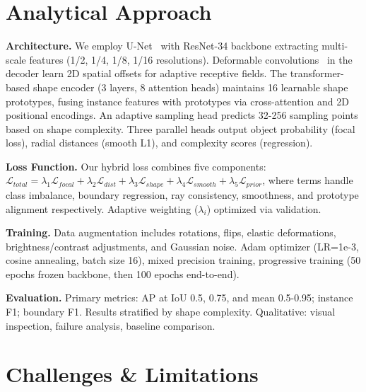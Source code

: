 \documentclass[acmlarge]{acmart}
\begin{document}
\section{Analytical Approach}

\textbf{Architecture.} We employ U-Net~\cite{ronneberger2015unet} with ResNet-34 backbone extracting multi-scale features (1/2, 1/4, 1/8, 1/16 resolutions). Deformable convolutions~\cite{dai2017deformable} in the decoder learn 2D spatial offsets for adaptive receptive fields. The transformer-based shape encoder (3 layers, 8 attention heads) maintains 16 learnable shape prototypes, fusing instance features with prototypes via cross-attention and 2D positional encodings. An adaptive sampling head predicts 32-256 sampling points based on shape complexity. Three parallel heads output object probability (focal loss), radial distances (smooth L1), and complexity scores (regression).

\textbf{Loss Function.} Our hybrid loss combines five components: $\mathcal{L}_{total} = \lambda_1 \mathcal{L}_{focal} + \lambda_2 \mathcal{L}_{dist} + \lambda_3 \mathcal{L}_{shape} + \lambda_4 \mathcal{L}_{smooth} + \lambda_5 \mathcal{L}_{prior}$, where terms handle class imbalance, boundary regression, ray consistency, smoothness, and prototype alignment respectively. Adaptive weighting ($\lambda_i$) optimized via validation.

\textbf{Training.} Data augmentation includes rotations, flips, elastic deformations, brightness/contrast adjustments, and Gaussian noise. Adam optimizer (LR=1e-3, cosine annealing, batch size 16), mixed precision training, progressive training (50 epochs frozen backbone, then 100 epochs end-to-end).

\textbf{Evaluation.} Primary metrics: AP at IoU 0.5, 0.75, and mean 0.5-0.95; instance F1; boundary F1. Results stratified by shape complexity. Qualitative: visual inspection, failure analysis, baseline comparison.

\section{Challenges \& Limitations}
\end{document}

